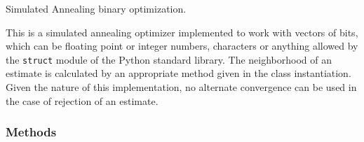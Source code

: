 Simulated Annealing binary optimization.

This is a simulated annealing optimizer implemented to work with vectors of
bits, which can be floating point or integer numbers, characters or anything
allowed by the \texttt{struct} module of the Python standard library. The
neighborhood of an estimate is calculated by an appropriate method given in
the class instantiation. Given the nature of this implementation, no
alternate convergence can be used in the case of rejection of an estimate.


  \subsubsection{Methods}

    \vspace{0.5ex}

